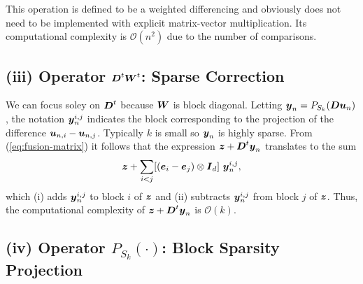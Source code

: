 \documentclass[11pt]{article}
\begin{document}
This operation is defined to be a weighted differencing and obviously does not need to be implemented with explicit matrix-vector multiplication.
Its computational complexity is \(\mathcal{O}(n^{2})\) due to the number of comparisons.

\subsection*{(iii) Operator \(\boldsymbol{D}^{t} \boldsymbol{W}^{t}\): Sparse Correction}

We can focus soley on \(\boldsymbol{D}^{t}\) because \(\boldsymbol{W}\) is block diagonal.
Letting \(\boldsymbol{y}_{n} = P_{S_{k}}(\boldsymbol{D} \boldsymbol{u}_{n})\), the notation \(\boldsymbol{y}^{i,j}_{n}\) indicates the block corresponding to the projection of the difference \(\boldsymbol{u}_{n,i} - \boldsymbol{u}_{n,j}\).
Typically \(k\) is small so \(\boldsymbol{y}_{n}\) is highly sparse.
From (\ref{eq:fusion-matrix}) it follows that the expression \(\boldsymbol{z} + \boldsymbol{D}^{t} \boldsymbol{y}_{n}\) translates to the sum
\begin{equation*}
    \boldsymbol{z} + \sum_{i<j} [(\boldsymbol{e}_{i} - \boldsymbol{e}_{j}) \otimes \boldsymbol{I}_{d}]~\boldsymbol{y}^{i,j}_{n},
\end{equation*}
which (i) adds \(\boldsymbol{y}^{i,j}_{n}\) to block \(i\) of \(\boldsymbol{z}\) and (ii) subtracts \(\boldsymbol{y}^{i,j}_{n}\) from block \(j\) of \(\boldsymbol{z}\).
Thus, the computational complexity of \(\boldsymbol{z} + \boldsymbol{D}^{t} \boldsymbol{y}_{n}\) is \(\mathcal{O}(k)\).

\subsection*{(iv) Operator \(P_{S_{k}}(\cdot)\): Block Sparsity Projection}
\end{document}
